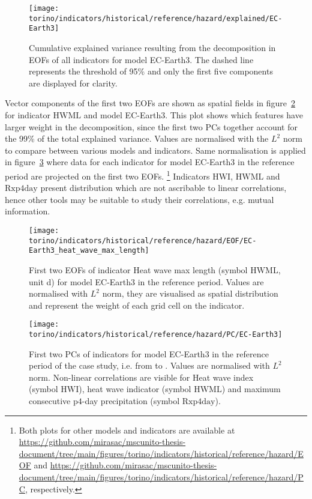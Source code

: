 \begin{figure}
  \centering
  \texttt{[image: torino/indicators/historical/reference/hazard/explained/EC-Earth3]}
  \caption{Cumulative explained variance resulting from the decomposition in \glspl{EOF} of all indicators for model EC-Earth3. The dashed line represents the threshold of 95\% and only the first five components are displayed for clarity.}
  \label{fig:explained_EC-Earth3}
\end{figure}

Vector components of the first two \glspl{EOF} are shown as spatial fields in figure~\ref{fig:EOF_EC-Earth3_heat_wave_max_length} for indicator $\mathrm{HWML}$ and model EC-Earth3. This plot shows which features have larger weight in the decomposition, since the first two \glspl{PC} together account for the 99\% of the total explained variance. Values are normalised with the $L^2$ norm to compare between various models and indicators. Same normalisation is applied in figure~\ref{fig:PC_EC-Earth3} where data for each indicator for model EC-Earth3 in the reference period are projected on the first two \glspl{EOF}.%
\footnote{Both plots for other models and indicators are available at \url{https://github.com/mirasac/mscunito-thesis-document/tree/main/figures/torino/indicators/historical/reference/hazard/EOF} and \url{https://github.com/mirasac/mscunito-thesis-document/tree/main/figures/torino/indicators/historical/reference/hazard/PC}, respectively.}
Indicators $\mathrm{HWI}$, $\mathrm{HWML}$ and $\mathrm{Rxp4day}$ present distribution which are not ascribable to linear correlations, hence other tools may be suitable to study their correlations, e.g. mutual information.

\begin{figure}
  \centering
  \texttt{[image: torino/indicators/historical/reference/hazard/EOF/EC-Earth3\_heat\_wave\_max\_length]}
  \caption{First two \glspl{EOF} of indicator {Heat wave max length} (symbol $\mathrm{HWML}$, unit \unit{\day}) for model EC-Earth3 in the reference period. Values are normalised with $L^2$ norm, they are visualised as spatial distribution and represent the weight of each grid cell on the indicator.}
  \label{fig:EOF_EC-Earth3_heat_wave_max_length}
\end{figure}

\begin{figure}
  \centering
  \texttt{[image: torino/indicators/historical/reference/hazard/PC/EC-Earth3]}
  \caption{First two \glspl{PC} of indicators for model EC-Earth3 in the reference period of the case study, i.e. from  to . Values are normalised with $L^2$ norm. Non-linear correlations are visible for {Heat wave index} (symbol $\mathrm{HWI}$), heat wave indicator (symbol $\mathrm{HWML}$) and maximum consecutive $\mathrm{p4}$-day precipitation (symbol $\mathrm{Rxp4day}$).}
  \label{fig:PC_EC-Earth3}
\end{figure}

